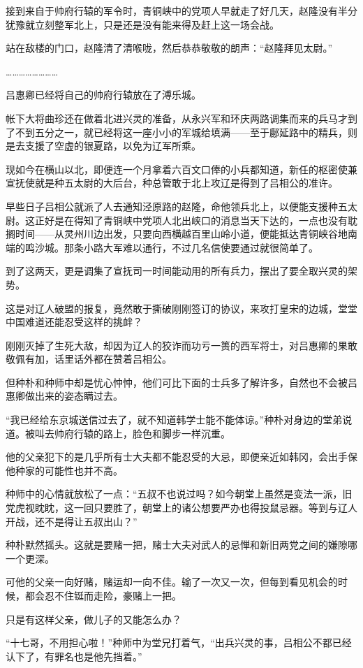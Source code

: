 接到来自于帅府行辕的军令时，青铜峡中的党项人早就走了好几天，赵隆没有半分犹豫就立刻整军北上，只是还是没有能来得及赶上这一场会战。

站在敌楼的门口，赵隆清了清喉咙，然后恭恭敬敬的朗声：“赵隆拜见太尉。”

……………………

吕惠卿已经将自己的帅府行辕放在了溥乐城。

帐下大将曲珍还在做着北进兴灵的准备，从永兴军和环庆两路调集而来的兵马才到了不到五分之一，就已经将这一座小小的军城给填满——至于鄜延路中的精兵，则是去支援了空虚的银夏路，以免为辽军所乘。

现如今在横山以北，即便连一个月拿着六百文口俸的小兵都知道，新任的枢密使兼宣抚使就是种五太尉的大后台，种总管敢于北上攻辽是得到了吕相公的准许。

早些日子吕相公就派了人去通知泾原路的赵隆，命他领兵北上，以便能支援种五太尉。这正好是在得知了青铜峡中党项人北出峡口的消息当天下达的，一点也没有耽搁时间——从灵州川边出发，只要向西横越百里山岭小道，便能抵达青铜峡谷地南端的鸣沙城。那条小路大军难以通行，不过几名信使要通过就很简单了。

到了这两天，更是调集了宣抚司一时间能动用的所有兵力，摆出了要全取兴灵的架势。

这是对辽人破盟的报复，竟然敢于撕破刚刚签订的协议，来攻打皇宋的边城，堂堂中国难道还能忍受这样的挑衅？

刚刚灭掉了生死大敌，却因为辽人的狡诈而功亏一篑的西军将士，对吕惠卿的果敢敬佩有加，话里话外都在赞着吕相公。

但种朴和种师中却是忧心忡忡，他们可比下面的士兵多了解许多，自然也不会被吕惠卿做出来的姿态瞒过去。

“我已经给东京城送信过去了，就不知道韩学士能不能体谅。”种朴对身边的堂弟说道。被叫去帅府行辕的路上，脸色和脚步一样沉重。

他的父亲犯下的是几乎所有士大夫都不能忍受的大忌，即便亲近如韩冈，会出手保他种家的可能性也并不高。

种师中的心情就放松了一点：“五叔不也说过吗？如今朝堂上虽然是变法一派，旧党虎视眈眈，这一回只要胜了，朝堂上的诸公想要严办也得投鼠忌器。等到与辽人开战，还不是得让五叔出山？”

种朴默然摇头。这就是要赌一把，赌士大夫对武人的忌惮和新旧两党之间的嫌隙哪一个更深。

可他的父亲一向好赌，赌运却一向不佳。输了一次又一次，但每到看见机会的时候，都会忍不住铤而走险，豪赌上一把。

只是有这样父亲，做儿子的又能怎么办？

“十七哥，不用担心啦！”种师中为堂兄打着气，“出兵兴灵的事，吕相公不都已经认下了，有罪名也是他先挡着。”

